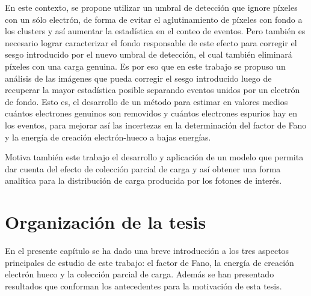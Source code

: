 En este contexto, se propone utilizar un umbral de detección que ignore píxeles con un sólo electrón, de forma de evitar el aglutinamiento de píxeles con fondo a los clusters y así aumentar la estadística en el conteo de eventos. Pero también es necesario lograr caracterizar el fondo responsable de este efecto para corregir el sesgo introducido por el nuevo umbral de detección, el cual también eliminará píxeles con una carga genuina.
Es por eso que en este trabajo se propuso un análisis de las imágenes que pueda corregir el sesgo introducido luego de recuperar la mayor estadística posible separando eventos unidos por un electrón de fondo. 
Esto es, el desarrollo de un método para estimar en valores medios cuántos electrones genuinos son removidos y cuántos electrones espurios hay en los eventos, para mejorar así las incertezas en la determinación del factor de Fano y la energía de creación electrón-hueco a bajas energías.

Motiva también este trabajo el desarrollo y aplicación de un modelo que permita dar cuenta del efecto de colección parcial de carga y así obtener una forma analítica para la distribución de carga producida por los fotones de interés.

\section{Organización de la tesis}
\noindent En el presente capítulo se ha dado una breve introducción a los tres aspectos principales de estudio de este trabajo: el factor de Fano, la energía de creación electrón hueco y la colección parcial de carga. Además se han presentado resultados que conforman los antecedentes para la motivación de esta tesis.

